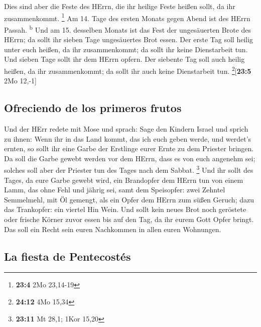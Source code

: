  Dies sind aber die Feste des HErrn, die ihr heilige Feste
heißen sollt, da ihr zusammenkommt. \footnote{\textbf{23:4} 2Mo 23,14-19}
 Am 14. Tage des ersten Monats gegen Abend ist des HErrn
Passah. \textsuperscript{b}  Und am 15. desselben Monats
ist das Fest der ungesäuerten Brote des HErrn; da sollt ihr sieben Tage
ungesäuertes Brot essen.  Der erste Tag soll heilig unter
euch heißen, da ihr zusammenkommt; da sollt ihr keine Dienstarbeit tun.
 Und sieben Tage sollt ihr dem HErrn opfern. Der siebente
Tag soll auch heilig heißen, da ihr zusammenkommt; da sollt ihr auch
keine Dienstarbeit tun. \footnote{\textbf{24:12} 4Mo 15,34}{[}\textbf{23:5}
2Mo 12,-1{]}

\hypertarget{ofreciendo-de-los-primeros-frutos}{%
\subsection{Ofreciendo de los primeros
frutos}\label{ofreciendo-de-los-primeros-frutos}}

 Und der HErr redete mit Mose und sprach: 
Sage den Kindern Israel und sprich zu ihnen: Wenn ihr in das Land kommt,
das ich euch geben werde, und werdet's ernten, so sollt ihr eine Garbe
der Erstlinge eurer Ernte zu dem Priester bringen.  Da
soll die Garbe gewebt werden vor dem HErrn, dass es von euch angenehm
sei; solches soll aber der Priester tun des Tages nach dem Sabbat.
\footnote{\textbf{23:11} Mt 28,1; 1Kor 15,20}  Und ihr
sollt des Tages, da eure Garbe gewebt wird, ein Brandopfer dem HErrn tun
von einem Lamm, das ohne Fehl und jährig sei,  samt dem
Speisopfer: zwei Zehntel Semmelmehl, mit Öl gemengt, als ein Opfer dem
HErrn zum süßen Geruch; dazu das Trankopfer: ein viertel Hin Wein.
 Und sollt kein neues Brot noch geröstete oder frische
Körner zuvor essen bis auf den Tag, da ihr eurem Gott Opfer bringt. Das
soll ein Recht sein euren Nachkommen in allen euren Wohnungen.

\hypertarget{la-fiesta-de-pentecostuxe9s}{%
\subsection{La fiesta de
Pentecostés}\label{la-fiesta-de-pentecostuxe9s}}

